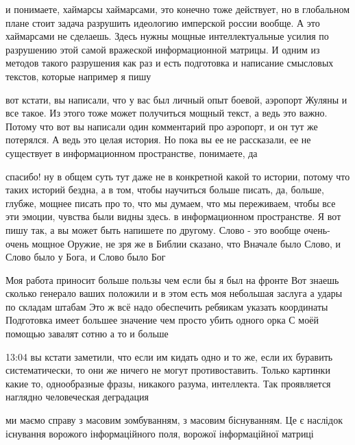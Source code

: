 и понимаете, хаймарсы хаймарсами, это конечно тоже действует, но в глобальном
плане стоит задача разрушить идеологию имперской россии вообще. А это
хаймарсами не сделаешь. Здесь нужны мощные интеллектуальные усилия по
разрушению этой самой вражеской информационной матрицы. И одним из методов
такого разрушения как раз и есть подготовка и написание смысловых текстов,
которые например я пишу 

вот кстати, вы написали, что у вас был личный опыт боевой, аэропорт Жуляны и
все такое. Из этого тоже может получиться мощный текст, а ведь это важно.
Потому что вот вы написали один комментарий про аэропорт, и он тут же
потерялся. А ведь это целая история. Но пока вы ее не рассказали, ее не
существует в информационном пространстве, понимаете, да

спасибо! ну в общем суть тут даже не в конкретной какой то истории, потому что
таких историй бездна, а в том, чтобы научиться больше писать, да, больше,
глубже, мощнее писать про то, что мы думаем, что мы переживаем, чтобы все эти
эмоции, чувства были видны здесь. в информационном пространстве. Я вот пишу
так, а вы может быть напишете по другому. Слово - это вообще очень-очень мощное
Оружие, не зря же в Библии сказано, что Вначале было Слово, и Слово было у
Бога, и Слово было Бог

Моя работа приносит больше пользы чем если бы я был на фронте Вот знаешь
сколько генерало ваших положили и в этом есть моя небольшая заслуга а удары по
складам штабам Это ж всё надо обеспечить ребяикам указать координаты Подготовка
имеет большее значение чем просто убить одного орка С моёй помощью завалят
сотню а то и больше

13:04
вы кстати заметили, что если им кидать одно и то же, если их буравить
систематически, то они же ничего не могут противоставить. Только картинки какие
то, однообразные фразы, никакого разума, интеллекта. Так проявляется наглядно
человеческая деградация



ми маємо справу з масовим зомбуванням, з масовим біснуванням. Це є наслідок
існування ворожого інформаційного поля, ворожої інформаційної матриці



